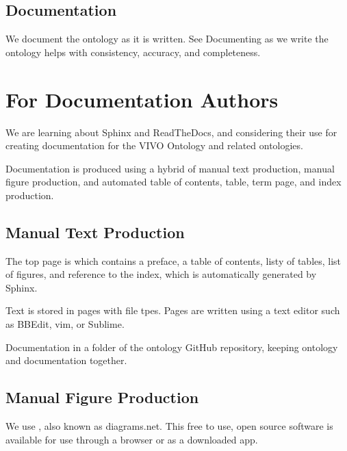 \documentclass[letterpaper,10pt,english]{sphinxmanual}
\begin{document}
\section{Documentation}
\label{\detokenize{ontology-authors:documentation}}
\sphinxAtStartPar
We document the ontology as it is written.  See   Documenting as we write the ontology helps with
consistency, accuracy, and completeness.


\chapter{For Documentation Authors}
\label{\detokenize{documentation-authors:for-documentation-authors}}\label{\detokenize{documentation-authors::doc}}
\sphinxAtStartPar
We are learning about Sphinx and ReadTheDocs, and considering their use
for creating documentation for the VIVO Ontology and related ontologies.

\sphinxAtStartPar
Documentation is produced using a hybrid of manual text production, manual
figure production, and automated table of contents, table, term page, and index
production.


\section{Manual Text Production}
\label{\detokenize{documentation-authors:manual-text-production}}
\sphinxAtStartPar
The top page is  which contains a preface, a table of contents, listy
of tables, list of figures, and reference to the index, which is automatically
generated by Sphinx.

\sphinxAtStartPar
Text is stored in pages with  file tpes.  Pages are written using a text editor
such as BBEdit, vim, or Sublime.

\sphinxAtStartPar
Documentation in a  folder of the ontology GitHub repository, keeping ontology and
documentation together.


\section{Manual Figure Production}
\label{\detokenize{documentation-authors:manual-figure-production}}
\sphinxAtStartPar
We use , also known as diagrams.net.  This free to use,
open source software is available for use through a browser or as a downloaded
app.
\end{document}
